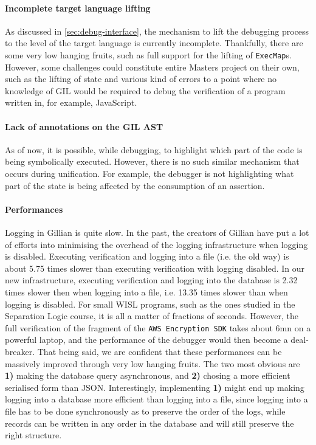 \paragraph{Incomplete target language lifting} As discussed  in \autoref{sec:debug-interface}, the mechanism to lift the debugging
process to the level of the target language is currently incomplete.
Thankfully, there are some very low hanging fruits, such as full support
for the lifting of \texttt{ExecMap}s. However, some challenges could constitute
entire Masters project on their own, such as the lifting of state and various
kind of errors to a point where no knowledge of GIL would be required to debug
the verification of a program written in, for example, JavaScript.

\paragraph{Lack of annotations on the GIL AST} As of now, it is possible, while
debugging, to highlight which part of the code is being symbolically executed.
However, there is no such similar mechanism that occurs during unification.
For example, the debugger is not highlighting what part of the state is being
affected by the consumption of an assertion.

\paragraph{Performances} Logging in Gillian is quite slow. In the past, the
creators of Gillian have put a lot of efforts into minimising the overhead of
the logging infrastructure when logging is disabled. Executing verification
and logging into a file (i.e. the old way) is about 5.75\footnotemark[1]{} times
slower than executing verification with logging disabled. In our new
infrastructure, executing verification and logging into the database is
2.32\footnotemark[1]{} times slower then when logging into a file, i.e.
13.35\footnotemark[1]{} times slower than when logging is disabled. For small
WISL programs, such as the ones studied in the Separation Logic course, it is
all a matter of fractions of seconds. However, the full verification of the
fragment of the \texttt{AWS Encryption SDK} takes about 6mn on a powerful
laptop, and the performance of the debugger would then become a deal-breaker.
 That being said, we are confident that these performances can be
massively improved through very low hanging fruits. The two most obvious are
\textbf{1)} making the database query asynchronous, and \textbf{2)} chosing a
more efficient serialised form than JSON. Interestingly, implementing \textbf{1)}
might end up making  logging into a database more efficient than logging
into a file, since logging into a file has to be done synchronously as to
preserve the order of the logs, while records can be written in any order in the
database and will still preserve the right structure.

